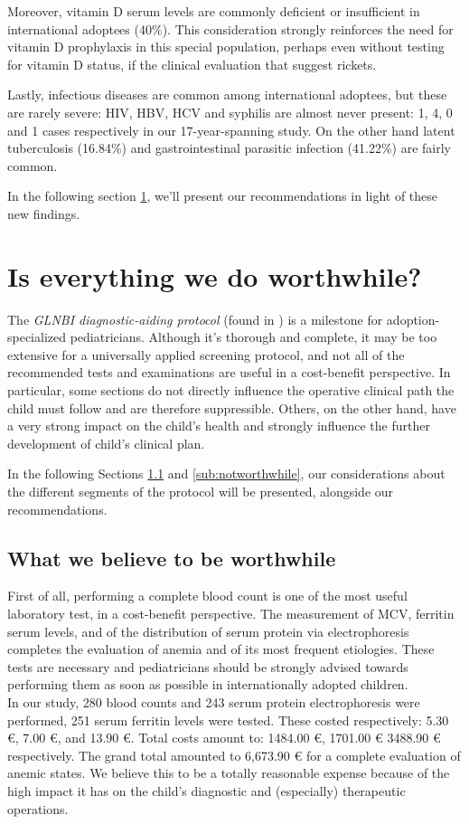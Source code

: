 Moreover, vitamin D serum levels are commonly deficient or insufficient in international adoptees (40\%). This consideration strongly reinforces the need for vitamin D prophylaxis  in this special population, perhaps even without testing for vitamin D status, if the clinical evaluation that suggest rickets.

Lastly, infectious diseases are common among international adoptees, but these are rarely severe: HIV, HBV, HCV and syphilis are almost never present: 1, 4, 0 and 1 cases respectively in our 17-year-spanning study. On the other hand latent tuberculosis (16.84\%) and gastrointestinal parasitic infection (41.22\%) are fairly common.

In the following section \ref{sec:worthwhile?}, we'll present our recommendations in light of these new findings.

\section{Is everything we do worthwhile?}\label{sec:worthwhile?}
The \textit{GLNBI diagnostic-aiding protocol} (found in \cite{GNLBI2}) is a milestone for adoption-specialized pediatricians. Although it's thorough and complete, it may be too extensive for a universally applied screening protocol, and not all of the recommended tests and examinations are useful in a cost-benefit perspective. In particular, some sections do not directly influence the operative clinical path the child must follow and are therefore suppressible. Others, on the other hand, have a very strong impact on the child's health and strongly influence the further development of child's clinical plan.

In the following Sections \ref{sub:worthwhile} and \ref{sub:notworthwhile}, our considerations about the different segments of the protocol will be presented, alongside our recommendations.

\subsection{What we believe to be worthwhile}\label{sub:worthwhile}
First of all, performing a complete blood count is one of the most useful laboratory test, in a cost-benefit perspective. The measurement of MCV, ferritin serum levels, and of the distribution of serum protein via electrophoresis completes the evaluation of anemia and of its most frequent etiologies. These tests are necessary and pediatricians should be strongly advised towards performing them as soon as possible in internationally adopted children.\\
In our study, 280 blood counts and 243 serum protein electrophoresis were performed, 251 serum ferritin levels were tested. These costed respectively: 5.30 €, 7.00 €, and 13.90 €. Total costs amount to: 1484.00 €, 1701.00 € 3488.90 € respectively. The grand total amounted to 6,673.90 € for a complete evaluation of anemic states. We believe this to be a totally reasonable expense because of the high impact it has on the child's diagnostic and (especially) therapeutic operations.

